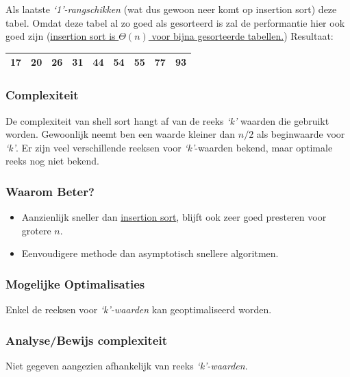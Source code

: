 \documentclass{article}
\begin{document}
Als laatste \textit{`1'-rangschikken} (wat dus gewoon neer komt op insertion sort) deze tabel. Omdat deze tabel al zo goed als gesorteerd is zal de performantie hier ook goed zijn (\hyperref[sub:ins_sort_complexiteit]{insertion sort is $\Theta(n)$ voor bijna gesorteerde tabellen.}) Resultaat:
\begin{center}
\begin{tabular}{ |c|c|c|c|c|c|c|c|c| }
\hline
17 & 20 & 26 & 31 & 44 & 54 & 55 & 77 & 93 \\
\hline
\end{tabular}
\end{center}

\subsubsection{Complexiteit} %
\label{sub:shell_sort_complexiteit}
De complexiteit van shell sort hangt af van de reeks \textit{`k'} waarden die gebruikt worden. Gewoonlijk neemt ben een waarde kleiner dan $n/2$ als beginwaarde voor \textit{`k'}. Er zijn veel verschillende reeksen voor \textit{`k'}-waarden bekend, maar optimale reeks nog niet bekend.

\subsubsection{Waarom Beter?} %
\label{sub:shell_sort_waarom_beter}
\begin{itemize}
	\item Aanzienlijk sneller dan \hyperref[sub:insertion_sort]{insertion sort}, blijft ook zeer goed presteren voor grotere $n$.
	\item Eenvoudigere methode dan asymptotisch snellere algoritmen.
\end{itemize}


\subsubsection{Mogelijke Optimalisaties} %
\label{sub:shell_sort_mogelijke_optimalisaties}
Enkel de reeksen voor \textit{`k'-waarden} kan geoptimaliseerd worden.

\subsubsection{Analyse/Bewijs complexiteit} %
\label{sub:shell_sort_analyse_bewijs_complexiteit}
Niet gegeven aangezien afhankelijk van reeks \textit{`k'-waarden}.
\end{document}
